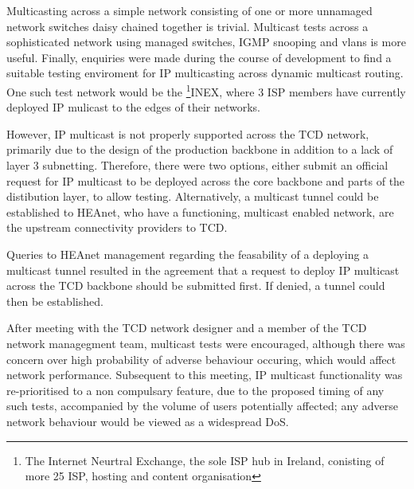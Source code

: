 Multicasting across a simple network consisting of one or 
more unnamaged network switches daisy chained together is trivial. 
Multicast tests across a sophisticated network using managed
switches, IGMP snooping and vlans is more useful. Finally, enquiries
were made during the course of development to find a suitable testing
enviroment for IP multicasting across dynamic multicast routing. One
such test network would be the \footnote{The Internet Neurtral
Exchange, the sole ISP hub in Ireland, conisting of more
25 ISP, hosting and content organisation}{INEX}, where 3 ISP members 
have currently deployed IP mulicast to the edges of their networks.


However, IP multicast is not properly supported across the 
TCD network, primarily due to the design of the production backbone in 
addition to a lack of layer 3 subnetting. Therefore, there were two 
options, either submit an official request for IP multicast to be 
deployed across the core backbone and parts of the distibution layer, 
to allow testing. Alternatively, a multicast tunnel could be established
to HEAnet, who have a functioning, multicast enabled network, are the 
upstream connectivity providers to TCD. 


Queries to HEAnet management regarding the feasability of a deploying
a multicast tunnel resulted in the agreement that a request to deploy IP
multicast across the TCD backbone should be submitted first. If denied,
a tunnel could then be established. 


After meeting with the TCD network designer and a member of the TCD 
network managegment team, multicast tests were encouraged, although 
there was concern over high probability of adverse behaviour occuring, 
which would affect network performance. Subsequent to this meeting, 
IP multicast functionality was re-prioritised to a non compulsary
feature, due to the proposed timing of any such tests, accompanied by 
the volume of users potentially affected; any adverse network behaviour 
would be viewed as a widespread DoS. 
